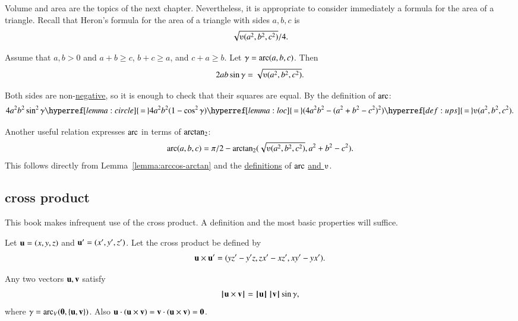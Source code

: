%
Volume and area are the topics of the next chapter.  Nevertheless, it is appropriate
to consider immediately a formula for the area of a triangle.
Recall that Heron's formula for the area of 
a triangle with sides $a,b,c$ is $$\sqrt{\ups(a^2,b^2,c^2)}/4.$$  

\begin{lemma}\label{lemma:los}
Assume that $a,b>0$ and $a+b\ge c$, $b+c\ge a$, and $c+a\ge b$.
Let $\gamma=\operatorname{arc}(a,b,c)$.  Then
        $$2 a b \sin\gamma = \sqrt{\ups(a^2,b^2,c^2)}.$$
\end{lemma}
%
%
%
\begin{proved}
Both sides are non-\hyperref[lemma:sin-pos]{negative}, so it is enough to check
that their squares are equal.  By the definition of $\operatorname{arc}$:
      $$
     4 a^2 b^2 \sin^2\gamma 
    \hyperref[lemma:circle]{\,=\,} 4 a^2 b^2 (1-\cos^2\gamma) 
    \hyperref[lemma:loc]{\,=\,} (4 a^2 b^2 - (a^2 + b^2 -
      c^2)^2) 
    \hyperref[def:ups]{\,=\,} \ups(a^2,b^2,c^2).$$
\swallowed\end{proved}

Another useful relation expresses $\operatorname{arc}$ in terms of ${\operatorname{arctan_2}}$:
  $$
  \arc(a,b,c) = 
    \pi/2 - \atn({\sqrt{\ups(a^2,b^2,c^2)}},{ a^2 + b^2 - c^2}).
    $$
This follows directly from Lemma~\ref{lemma:arccos-arctan} and the \hyperref[def:arc]{definitions}
of $\operatorname{arc}$ \hyperref[def:ups]{and $\ups$}.



\subsection{cross product} 

This book makes infrequent use of the cross product.
A definition and the most basic properties will suffice.

\begin{definition}\label{def:cross}   
Let ${\mathbf u} =(x,y,z)$ and ${\mathbf u}' = (x',y',z')$.  
Let the cross product be defined
by
    $$
    {\mathbf u} \times {\mathbf u}' = (y z' - y' z, z x' - x z', x y' - y x').
    $$
%
%
%
\end{definition}

\begin{lemma}  
Any two vectors ${\mathbf u},{\mathbf v}$ satisfy
    $${{\hskip0.1em|\hskip-0.15em|\hskip0.1em}{\mathbf u} \times {\mathbf v}{\hskip0.1em|\hskip-0.15em|\hskip0.1em}} = {{\hskip0.1em|\hskip-0.15em|\hskip0.1em}{\mathbf u}{\hskip0.1em|\hskip-0.15em|\hskip0.1em}}\,{{\hskip0.1em|\hskip-0.15em|\hskip0.1em}{\mathbf v}{\hskip0.1em|\hskip-0.15em|\hskip0.1em}}\sin\gamma,$$
where $\gamma=\operatorname{arc}_V({\mathbf 0},\{{\mathbf u},{\mathbf v}\})$.
Also ${\mathbf u} \cdot ({\mathbf u}\times {\mathbf v}) = {\mathbf v}\cdot ({\mathbf u}\times {\mathbf v}) = {\mathbf 0}$.
\end{lemma}

